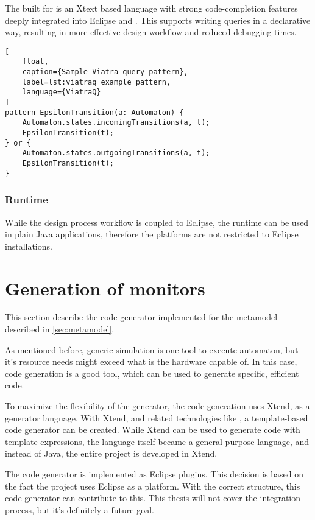 The \dsl{} built for \viatraq{} is an Xtext based language with strong code-completion features deeply integrated into Eclipse and \emf{}. This \dsl{} supports writing queries in a declarative way, resulting in more effective design workflow and reduced debugging times.

\begin{lstlisting}[
	float,
	caption={Sample Viatra query pattern},
	label=lst:viatraq_example_pattern,
	language={ViatraQ}
]
pattern EpsilonTransition(a: Automaton) {
	Automaton.states.incomingTransitions(a, t);
	EpsilonTransition(t);
} or {
	Automaton.states.outgoingTransitions(a, t);
	EpsilonTransition(t);
}
\end{lstlisting}

\subsubsection{Runtime}

While the design process workflow is coupled to Eclipse, the \viatraq{} runtime can be used in plain Java applications, therefore the platforms are not restricted to Eclipse installations.

\section{Generation of monitors}

This section describe the code generator implemented for the metamodel described in \cref{sec:metamodel}.

As mentioned before, generic simulation is one tool to execute automaton, but it's resource needs might exceed what is the hardware capable of. In this case, \mtc{} code generation is a good tool, which can be used to generate specific, efficient code.

To maximize the flexibility of the generator, the code generation uses Xtend, as a generator language. With Xtend, and related technologies like \viatraq{}, a template-based code generator can be created. While Xtend can be used to generate code with template expressions, the language itself became a general purpose language, and instead of Java, the entire project is developed in Xtend.

The code generator is implemented as Eclipse plugins. This decision is based on the fact the \viatrac{} project uses Eclipse as a platform. With the correct structure, this code generator can contribute to this. This thesis will not cover the integration process, but it's definitely a future goal.

